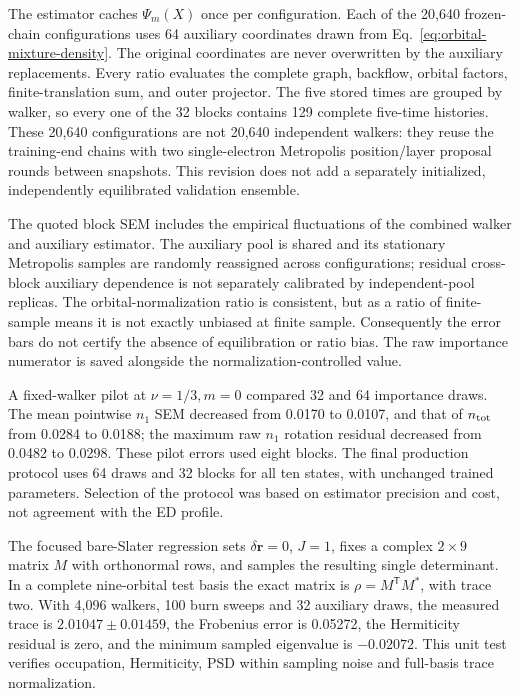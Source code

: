 The estimator caches $\Psi_m(X)$ once per configuration. Each of the
20,640 frozen-chain configurations uses 64 auxiliary coordinates drawn from
Eq.~\eqref{eq:orbital-mixture-density}. The original coordinates are never
overwritten by the auxiliary replacements. Every ratio evaluates the complete
graph, backflow, orbital factors, finite-translation sum, and outer projector.
The five stored times are grouped by walker, so every one of the 32 blocks
contains 129 complete five-time histories. These 20,640 configurations are
not 20,640 independent walkers: they reuse the training-end chains with two
single-electron Metropolis position/layer proposal rounds between snapshots.
This revision does not add a separately initialized, independently
equilibrated validation ensemble.

The quoted block SEM includes the empirical fluctuations of the combined
walker and auxiliary estimator. The auxiliary pool is shared and its
stationary Metropolis samples are randomly reassigned across configurations;
residual cross-block auxiliary dependence is not separately calibrated by
independent-pool replicas. The orbital-normalization ratio is consistent,
but as a ratio of finite-sample means it is not exactly unbiased at finite
sample. Consequently the error bars do not certify the absence of
equilibration or ratio bias. The raw importance numerator is saved alongside
the normalization-controlled value.

A fixed-walker pilot at $\nu=1/3,m=0$ compared 32 and 64 importance draws.
The mean pointwise $n_1$ SEM decreased from 0.0170 to 0.0107, and that of
$n_{\rm tot}$ from 0.0284 to 0.0188; the maximum raw $n_1$ rotation residual
decreased from 0.0482 to 0.0298. These pilot errors used eight blocks.
The final production protocol uses 64 draws and 32 blocks for all ten
states, with unchanged trained parameters. Selection of the protocol was
based on estimator precision and cost, not agreement with the ED profile.



The focused bare-Slater regression sets $\delta\bm r=0$, $J=1$, fixes a
complex $2\times9$ matrix $M$ with orthonormal rows, and samples the resulting
single determinant.  In a complete nine-orbital test basis the exact matrix is
$\rho=M^{\mathsf T}M^*$, with trace two.  With 4,096 walkers, 100 burn sweeps
and 32 auxiliary draws, the measured trace is $2.01047\pm0.01459$, the
Frobenius error is 0.05272, the Hermiticity residual is zero, and the minimum
sampled eigenvalue is $-0.02072$.  This unit test verifies occupation,
Hermiticity, PSD within sampling noise and full-basis trace normalization.

